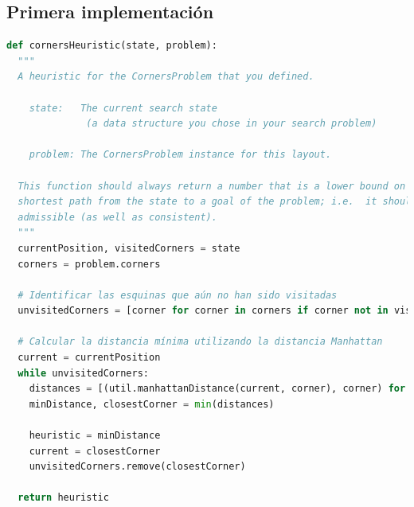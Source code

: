 \documentclass{report}
\begin{document}
        \subsection*{Primera implementación}
          \begin{lstlisting}[language=Python, caption=Implementación inicial de la heurística del problema de las esquinas]
def cornersHeuristic(state, problem):
  """
  A heuristic for the CornersProblem that you defined.

    state:   The current search state
              (a data structure you chose in your search problem)

    problem: The CornersProblem instance for this layout.

  This function should always return a number that is a lower bound on the
  shortest path from the state to a goal of the problem; i.e.  it should be
  admissible (as well as consistent).
  """
  currentPosition, visitedCorners = state
  corners = problem.corners

  # Identificar las esquinas que aún no han sido visitadas
  unvisitedCorners = [corner for corner in corners if corner not in visitedCorners]

  # Calcular la distancia mínima utilizando la distancia Manhattan
  current = currentPosition
  while unvisitedCorners:
    distances = [(util.manhattanDistance(current, corner), corner) for corner in unvisitedCorners]
    minDistance, closestCorner = min(distances)

    heuristic = minDistance
    current = closestCorner
    unvisitedCorners.remove(closestCorner)

  return heuristic
          \end{lstlisting}
\end{document}
